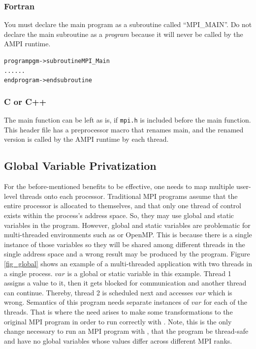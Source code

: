 \documentclass[10pt]{article}
\begin{document}
\subsubsection{Fortran}

You must declare the main program as a subroutine called ``MPI\_MAIN''. 
Do not declare the main subroutine as a \textit{program} because 
it will never be called by the AMPI runtime.

\begin{alltt}

program pgm -> subroutine MPI_Main
	...		    		      ...
end program -> end subroutine
\end{alltt}

\subsubsection{C or C++}

The main function can be left as is, if \texttt{mpi.h} is included before the main function. 
This header file has a preprocessor macro that renames main, and 
the renamed version is called by the AMPI runtime by each thread.


\subsection{Global Variable Privatization}

For the before-mentioned benefits to be effective, one needs to map multiple
user-level threads onto each processor. Traditional MPI programs assume that the
entire processor is allocated to themselves, and that only one thread of
control exists within the process's address space. So, they may use global and
static variables in the program. However, global and static variables are
problematic for multi-threaded environments such as \ampi{} or OpenMP.
This is because there is a single instance of those variables so they will be 
shared among different threads in the single address space and a wrong result may be produced by the program.
Figure \ref{fig_global} shows an example of a multi-threaded application with 
two threads in a single process. $var$ is a global or static variable in this 
example. Thread 1 assigns a value to it, then it gets blocked for communication 
and another thread can continue. Thereby, thread 2 is scheduled next and 
accesses $var$ which is wrong. Semantics of this program needs separate 
instances of $var$ for each of the threads. That is where the need arises
to make some transformations to the original MPI program in order to run
correctly with \ampi{}. Note, this is the only change necessary to run an MPI 
program with \ampi{}, that the program be thread-safe and have no global variables
whose values differ across different MPI ranks.
\end{document}
